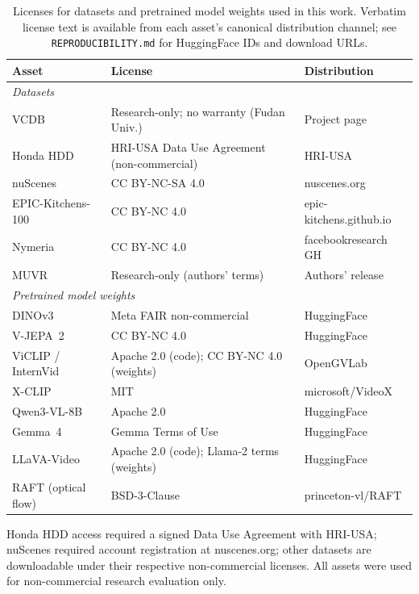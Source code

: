 \documentclass{article}
\theoremstyle{remark}
\begin{document}
\begin{table}[h]
\centering
\small
\caption{Licenses for datasets and pretrained model weights used in this work. Verbatim license text is available from each asset's canonical distribution channel; see \texttt{REPRODUCIBILITY.md} for HuggingFace IDs and download URLs.}
\label{tab:licenses}
\begin{tabular}{lll}
\toprule
\textbf{Asset} & \textbf{License} & \textbf{Distribution} \\
\midrule
\multicolumn{3}{l}{\emph{Datasets}} \\
VCDB~\cite{vcdb}                      & Research-only; no warranty (Fudan Univ.)    & Project page \\
Honda HDD~\cite{honda_hdd}            & HRI-USA Data Use Agreement (non-commercial) & HRI-USA \\
nuScenes~\cite{nuscenes}              & CC BY-NC-SA 4.0                             & nuscenes.org \\
EPIC-Kitchens-100~\cite{epickitchens} & CC BY-NC 4.0                                & epic-kitchens.github.io \\
Nymeria~\cite{nymeria}                & CC BY-NC 4.0                                & facebookresearch GH \\
MUVR~\cite{muvr}                      & Research-only (authors' terms)              & Authors' release \\
\midrule
\multicolumn{3}{l}{\emph{Pretrained model weights}} \\
DINOv3~\cite{dinov3}                  & Meta FAIR non-commercial                    & HuggingFace \\
V-JEPA~2~\cite{vjepa2}                & CC BY-NC 4.0                                & HuggingFace \\
ViCLIP / InternVid~\cite{viclip}      & Apache 2.0 (code); CC BY-NC 4.0 (weights)   & OpenGVLab \\
X-CLIP~\cite{xclip}                   & MIT                                         & microsoft/VideoX \\
Qwen3-VL-8B~\cite{qwen3vl}            & Apache 2.0                                  & HuggingFace \\
Gemma~4~\cite{gemma4}                 & Gemma Terms of Use                          & HuggingFace \\
LLaVA-Video~\cite{llavavideo}         & Apache 2.0 (code); Llama-2 terms (weights)  & HuggingFace \\
RAFT (optical flow)                   & BSD-3-Clause                                & princeton-vl/RAFT \\
\bottomrule
\end{tabular}
\end{table}

Honda HDD access required a signed Data Use Agreement with HRI-USA; nuScenes required account registration at nuscenes.org; other datasets are downloadable under their respective non-commercial licenses. All assets were used for non-commercial research evaluation only.
\end{document}
